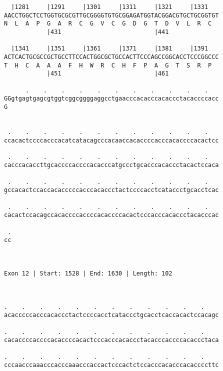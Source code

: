 \documentclass{article}
\begin{document}
\begin{Verbatim}
  |1281     |1291     |1301     |1311     |1321     |1331   
AACCTGGCTCCTGGTGCGCGTTGCGGGGTGTGCGGAGATGGTACGGACGTGCTGCGGTGT
N  L  A  P  G  A  R  C  G  V  C  G  D  G  T  D  V  L  R  C  
            |431                          |441              
  
  |1341     |1351     |1361     |1371     |1381     |1391   
ACTCACTGCGCCGCTGCCTTCCACTGGCGCTGCCACTTCCCAGCCGGCACCTCCCGGCCC
T  H  C  A  A  A  F  H  W  R  C  H  F  P  A  G  T  S  R  P  
            |451                          |461              
  
      .    .    .    .    .    .    .    .    .    .    .   
GGgtgagtgagcgtggtcggcggggaggcctgaacccacacccacaccctacaccccacc
G                                                           
                                                            
  
 .    .    .    .    .    .    .    .    .    .    .    .   
ccacactccccacccacatcatacagcccacaaccacaccccacccacaccccacactcc
                                                            
 .    .    .    .    .    .    .    .    .    .    .    .   
cacccacaccttgcaccccaccccacacccatgccctgcacccacaccctacactccaca
                                                            
 .    .    .    .    .    .    .    .    .    .    .    .   
gccacactccaccacacccccacccacaccctactccccacctcataccctgcacctcac
                                                            
 .    .    .    .    .    .    .    .    .    .    .    .   
cacactccacagccacaccccaccccacaccccacactcccacccacaccctacacccac
                                                            
 .
cc
  
  
 
Exon 12 | Start: 1528 | End: 1630 | Length: 102



.    .    .    .    .    .    .    .    .    .    .    .    
acacccccacccacaccctactccccacctcataccctgcacctcaccacactccacagc
                                                            
.    .    .    .    .    .    .    .    .    .    .    .    
cacaccccaccccacaccccacactcccacccacaccctacacccaccccacaccctaca
                                                            
.    .    .    .    .    .    .    .    .    .    .    .    
cccaacccaaacccacccaaacccaccactcccactctccacccacacccacaccccttc
                                                            

\end{Verbatim}
\end{document}
